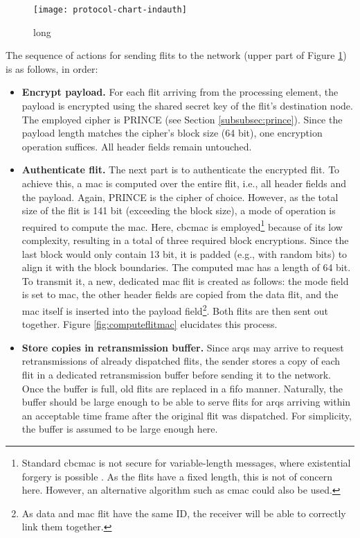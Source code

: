 \begin{figure}
    \centering
    \texttt{[image: protocol-chart-indauth]}
    \caption[short]{long}
    \label{fig:protchartindauth}
\end{figure}

The sequence of actions for sending flits to the network (upper part of Figure \ref{fig:protchartindauth}) is as follows, in order:
\begin{itemize}
    \item \textbf{Encrypt payload.} For each flit arriving from the processing element, the payload is encrypted using the shared secret key of the
        flit's destination node. The employed cipher is PRINCE (see Section \ref{subsubsec:prince}). Since the payload length matches the cipher's
        block size (64 bit), one encryption operation suffices. All header fields remain untouched.
    \item \textbf{Authenticate flit.} The next part is to authenticate the encrypted flit. To achieve this, a \gls{mac} is computed over the entire
        flit, i.e., all header fields and the payload. Again, PRINCE is the cipher of choice. However, as the total size of the flit is 141 bit
        (exceeding the block size), a mode of operation is required to compute the \gls{mac}. Here, \gls{cbcmac} is employed\footnote{Standard
        \gls{cbcmac} is not secure for variable-length messages, where existential forgery is possible \cite{wikilengthextattack}. As the flits have a
        fixed length, this is not of concern here. However, an alternative algorithm such as \gls{cmac} could also be used.} because of its low
        complexity, resulting in a total of three required block encryptions. Since the last block would only contain 13 bit, it is
        padded (e.g., with random bits) to align it with the block boundaries. The computed \gls{mac} has a length of 64 bit. To transmit it, a new, dedicated
        \gls{mac} flit is created as follows: the mode field is set to \gls{mac}, the other header fields are copied from the data flit, and the
        \gls{mac} itself is inserted into the payload field\footnote{As data and \gls{mac} flit have the same ID, the receiver will be able to
        correctly link them together.}. Both flits are then sent out together. Figure \vref{fig:computeflitmac} elucidates this process.
    \item \textbf{Store copies in retransmission buffer.} Since \glspl{arq} may arrive to request retransmissions of already dispatched flits, the
        sender stores a copy of each flit in a dedicated retransmission buffer before sending it to the network. Once the buffer is full, old flits
        are replaced in a \gls{fifo} manner. Naturally, the buffer should be large enough to be able to serve flits for \glspl{arq} arriving within an
        acceptable time frame after the original flit was dispatched. For simplicity, the buffer is assumed to be large enough here.
\end{itemize}
\vspace{0.5\baselineskip}

